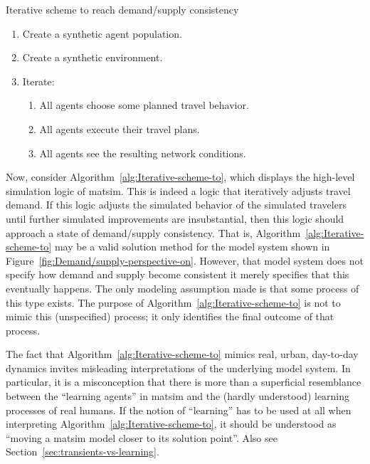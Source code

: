\begin{algorithm}
\caption{\label{alg:Iterative-scheme-to}Iterative scheme to reach demand/supply
consistency}

\begin{enumerate}
\item Create a synthetic agent population.
\item Create a synthetic environment.
\item Iterate:

\begin{enumerate}
\item All agents choose some planned travel behavior.
\item All agents execute their travel plans.
\item All agents see the resulting network conditions.\end{enumerate}
\end{enumerate}
\end{algorithm}


Now, consider Algorithm~\ref{alg:Iterative-scheme-to}, which displays the
high-level simulation logic of \gls{matsim}. This is indeed a logic that
iteratively adjusts travel demand. If this logic adjusts the simulated behavior
of the simulated travelers until further simulated improvements are
insubstantial, then this logic should approach a state of demand/supply
consistency. That is, Algorithm~\ref{alg:Iterative-scheme-to} may be a valid
solution method for the model system shown in
Figure~\ref{fig:Demand/supply-perspective-on}.
However, that model system does not specify how demand and supply become
consistent\corr{,}{;} it merely specifies that this eventually happens.
The only modeling assumption made is that some process of this type exists. The
purpose of Algorithm~\ref{alg:Iterative-scheme-to} is not to mimic this
(unspecified) process; it only identifies the final outcome of that process.

The fact that Algorithm~\ref{alg:Iterative-scheme-to} 
mimics real, urban, day-to-day dynamics invites misleading interpretations
of the underlying model system. In particular, it is a misconception
that  there is more than a superficial resemblance between the
{}``learning agents'' in \gls{matsim} and the (hardly understood) learning
processes of real humans. If the notion of {}``learning'' has to
be used at all when interpreting Algorithm~\ref{alg:Iterative-scheme-to},
it should be understood as {}``moving a \gls{matsim} model closer to its
solution point''.  Also see Section~\ref{sec:transients-vs-learning}.

